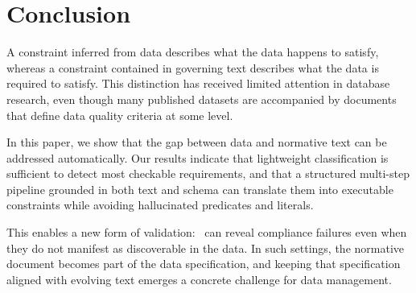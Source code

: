 \section{Conclusion}
\label{sec:conclusion}

A constraint inferred from data describes what the data happens to satisfy, whereas a constraint contained in governing text describes what the data is required to satisfy. This distinction \subs{ }{}has received limited attention in database research, even though many published datasets are accompanied by documents that define data quality criteria at some level. 

In this paper, we show that the gap between data and normative text can be addressed automatically. Our results indicate that lightweight classification is sufficient to detect \subs{ }{}most checkable requirements, and that a structured multi-step pipeline grounded in both text and schema can translate them into executable constraints while avoiding hallucinated predicates and literals. 

This enables a new form of validation: \system\ can reveal compliance failures even when they do not manifest as discoverable  in the data. In such settings, the normative document becomes \subs{ }{}part of the data specification, and keeping that specification aligned with evolving text emerges  a concrete challenge for data management. 



